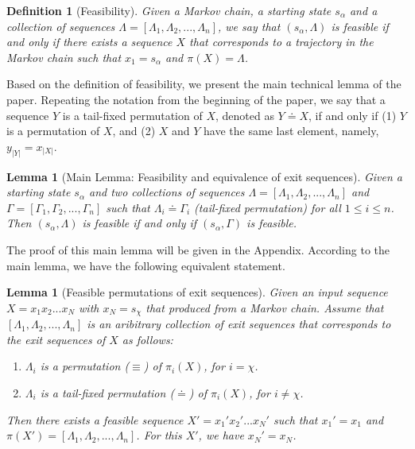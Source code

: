 \documentclass[journal]{IEEEtran}
\newtheorem{Definition}{Definition}
\newtheorem{Lemma}[Theorem]{Lemma}
\def\tmu{\doteq}
\def\pmu{\equiv}
\begin{document}
\begin{Definition}[Feasibility]
Given a Markov chain, a starting state $s_\alpha$  and a collection of sequences $\Lambda=[\Lambda_1,\Lambda_2,...,\Lambda_n]$,
we say that $(s_\alpha,\Lambda)$ is feasible if and only if there exists a sequence $X$ that corresponds to a trajectory in the Markov chain such that $x_{1}= s_\alpha$ and $\pi(X)=\Lambda$.
\end{Definition}

Based on the definition of feasibility, we present the main technical lemma of the paper. Repeating the notation from the beginning of the paper, we say that a sequence $Y$ is a tail-fixed permutation of $X$, denoted as $Y\tmu X$, if
and only if (1) $Y$ is a permutation of $X$, and (2) $X$ and $Y$ have the same last element, namely, $y_{|Y|}=x_{|X|}$.

\begin{Lemma}[Main Lemma: Feasibility and equivalence of exit sequences]
Given a starting state $s_\alpha$ and two collections of sequences $\Lambda=[\Lambda_1,\Lambda_2,...,\Lambda_n]$ and $\Gamma=[\Gamma_1,\Gamma_2,...,\Gamma_n]$
such that $\Lambda_i \tmu \Gamma_i$ (tail-fixed permutation) for all $1\leq i\leq n$. Then $(s_\alpha, \Lambda)$ is feasible if and only if $(s_\alpha, \Gamma)$ is feasible.
\label{lemma_main1}
\end{Lemma}

The proof of this main lemma will be given in the Appendix.  According to the main lemma, we have the following equivalent statement.

\begin{Lemma}[Feasible permutations of exit sequences]
Given an input sequence $X=x_1x_2...x_N$ with $x_N=s_\chi$ that produced from a Markov chain. Assume that $[\Lambda_1,\Lambda_2,...,\Lambda_n]$
is an aribitrary collection of exit sequences that corresponds to the exit sequences of $X$ as follows:
\begin{enumerate}
  \item $\Lambda_i$ is a permutation ($\pmu$) of $\pi_i(X)$,  for  $i=\chi$.
  \item $\Lambda_i$ is a tail-fixed permutation  ($\tmu$) of  $\pi_i(X)$, for  $i\neq \chi$.
\end{enumerate}
Then there exists a feasible sequence $X'=x_1'x_2'...x_N'$ such that
$x_1'=x_1$ and $\pi(X')=[\Lambda_1,\Lambda_2,...,\Lambda_n]$. For this $X'$, we have $x_N'=x_N$.\label{lemma_main2}
\end{Lemma}
\end{document}

